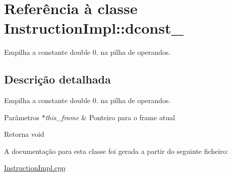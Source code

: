 \hypertarget{class_instruction_impl_1_1dconst__0}{}\section{Referência à classe Instruction\+Impl\+:\+:dconst\+\_}
\label{class_instruction_impl_1_1dconst__0}


Empilha a constante double 0. na pilha de operandos.  




\subsection{Descrição detalhada}
Empilha a constante double 0. na pilha de operandos. 


\begin{DoxyParams}{Parâmetros}
{\em $\ast$this\+\_\+frame} & Ponteiro para o frame atual \\
\hline
\end{DoxyParams}
\begin{DoxyReturn}{Retorna}
void 
\end{DoxyReturn}


A documentação para esta classe foi gerada a partir do seguinte ficheiro\+:\begin{DoxyCompactItemize}
\item 
\hyperlink{_instruction_impl_8cpp}{Instruction\+Impl.\+cpp}\end{DoxyCompactItemize}
